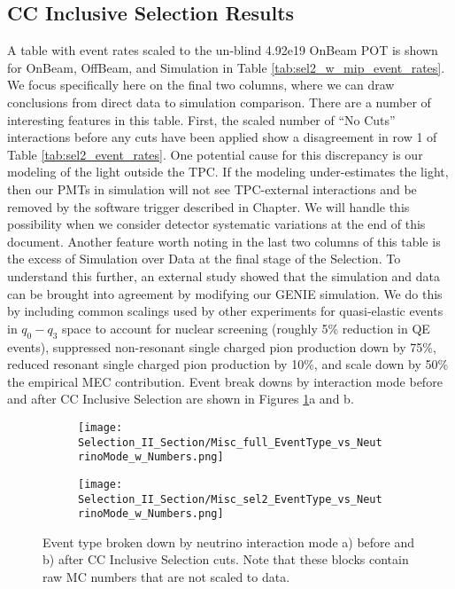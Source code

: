 \subsection{CC Inclusive Selection Results}
A table with event rates scaled to the un-blind 4.92e19 OnBeam POT is shown for OnBeam, OffBeam, and Simulation in Table \ref{tab:sel2_w_mip_event_rates}. We focus specifically here on the final two columns, where we can draw conclusions from direct data to simulation comparison. There are a number of interesting features in this table.  First, the scaled number of ``No Cuts'' interactions before any cuts have been applied show a disagreement in row 1 of Table \ref{tab:sel2_event_rates}.  One potential cause for this discrepancy is our modeling of the light outside the TPC.  If the modeling under-estimates the light, then our PMTs in simulation will not see TPC-external interactions and be removed by the software trigger described in Chapter. We will handle this possibility when we consider detector systematic variations at the end of this document.  Another feature worth noting in the last two columns of this table is the excess of Simulation over Data at the final stage of the Selection. To understand this further, an external study showed that the simulation and data can be brought into agreement by modifying our GENIE simulation. We do this by including common scalings used by other experiments for quasi-elastic events in $q_0 - q_3$ space to account for nuclear screening (roughly 5\% reduction in QE events), suppressed non-resonant single charged pion production down by 75\%, reduced resonant single charged pion production by 10\%, and scale down by 50\% the empirical MEC contribution. Event break downs by interaction mode before and after CC Inclusive Selection are shown in Figures \ref{fig:physics_sel2_inttype}a and b.  

\begin{figure}[t!]
\centering
  \begin{subfigure}[t]{0.35\textwidth}
    \centering
\texttt{[image: Selection\_II\_Section/Misc\_full\_EventType\_vs\_NeutrinoMode\_w\_Numbers.png]}
    \caption{ }
  \end{subfigure} 
  \hspace{20 mm}
  \begin{subfigure}[t]{0.35\textwidth}
    \centering
\texttt{[image: Selection\_II\_Section/Misc\_sel2\_EventType\_vs\_NeutrinoMode\_w\_Numbers.png]}
    \caption{ }
  \end{subfigure} 

\caption{ Event type broken down by neutrino interaction mode a) before and b) after CC Inclusive Selection cuts. Note that these blocks contain raw MC numbers that are not scaled to data. }
\label{fig:physics_sel2_inttype}
\end{figure}


